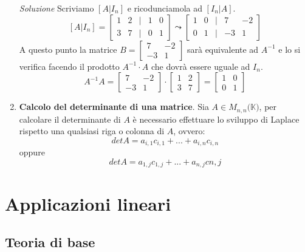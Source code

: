 \documentclass[12pt,a4paper,oneside]{book}
\begin{document}
\begin{enumerate}
	  \textit{Soluzione} \linebreak
	  Scriviamo $[A|I_n]$ e ricodunciamola ad $[I_n|A]$.
	  $$[A|I_n] = \begin{bmatrix}1 & 2 & | & 1 & 0 \\ 3& 7 & | & 0 & 1   \end{bmatrix} \leadsto 
	  \begin{bmatrix}1 & 0 & | & 7 & -2 \\ 0& 1 & | & -3 & 1   \end{bmatrix}$$
	  A questo punto la matrice $B=\begin{bmatrix}7 & -2 \\ -3 & 1   \end{bmatrix}$ sarà equivalente ad $A^
	  {-1}$ e lo si verifica facendo il prodotto $A^{-1}\cdot A$ che dovrà essere uguale ad $I_n$.
	  $$A^{-1}A = \begin{bmatrix}7 & -2 \\-3 & 1   \end{bmatrix} \cdot \begin{bmatrix}1 & 2 \\ 3& 7   
	  \end{bmatrix} = \begin{bmatrix}1 & 0 \\ 0 & 1   \end{bmatrix}$$

\item \textbf{Calcolo del determinante di una matrice}.
	  Sia $A \in M_{n,n}(\mathbb{K)}$, per calcolare il determinante di $A$ è necessario effettuare lo
	  sviluppo di Laplace rispetto una qualsiasi riga o colonna di $A$, ovvero: 
	  $$detA = a_{i, 1}c_{i, 1} + ... + a_{i, n}c_{i, n}$$
	  oppure
	  $$detA = a_{1, j}c_{1, j} + ... + a_{n, j}c{n, j}$$
	  
\end{enumerate}


\newpage

				\chapter{Applicazioni lineari}

			   \section{Teoria di base}
			
\end{document}
